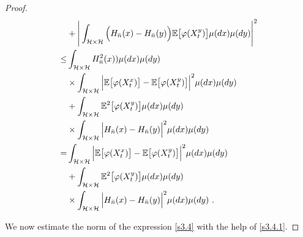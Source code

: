 \documentclass[review, onefignum, onetabnum]{siamart171218}
\begin{document}
\begin{proof}
\begin{equation}
\begin{aligned}
            &+
            \Bigg|
                \int_{\mathcal{H}
                \times
                \mathcal{H}
                }
                \Big(
                    H_{\bar n}(x) - H_{\bar n}(y)
                \Big)
                \mathbb{E}\big[
                    \varphi(X_t ^ y)
                \big]
                \mu(dx)\mu(dy)
            \Bigg|^2
            \\
            \le &
            \int_{\mathcal{H}\times \mathcal{H}}
                H_{\bar n}^2(x))
            \mu(dx)\mu(dy)
            \\
            &\times
                \int_{\mathcal{H}\times \mathcal{H}}
                \Big|
                    \mathbb{E}\big [
                        \varphi(X_t^x)
                    \big]
                    -
                    \mathbb{E}\big[
                        \varphi(X_t^y)
                    \big]
                \Big|^2
                \mu(dx)\mu(dy)
            \\
            &+
            \int_{\mathcal{H} \times \mathcal{H}}
                \mathbb{E}^2\big[
                    \varphi(X_t^y)
                \big]
            \mu(dx)\mu(dy)
            \\
             &\times
            \int_{\mathcal{H}\times \mathcal{H}}
            \Big|
                H_{\bar n}(x)-H_{\bar n}(y)
            \Big|^2
            \mu(dx)\mu(dy)
            \\
            =&
            \int_{\mathcal{H}\times \mathcal{H}}
                \Big|
                    \mathbb{E}\big [
                        \varphi(X_t^x)
                    \big]
                    -
                    \mathbb{E}\big[
                        \varphi(X_t^y)
                    \big]
                \Big|^2
                \mu(dx) \mu(dy)
            \\
            &+
            \int_{\mathcal{H}\times \mathcal{H}}
                \mathbb{E}^2\big[
                    \varphi(X_t^y)
                \big]
            \mu(dx)\mu(dy)
            \\
            & \times
            \int_{\mathcal{H}\times \mathcal{H}}
                \Big|
                    H_{\bar n}(x)
                    -
                    H_{\bar n}(y)
                \Big|^2
            \mu(dx)\mu(dy)
        \ .
    \end{aligned}
\end{equation}

We now estimate the norm of the expression \eqref{s3.4} with the help of
\eqref{s3.4.1}.


\end{proof}
\end{document}
